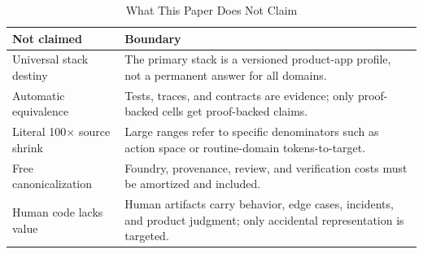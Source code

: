 \begin{table}[t]
\caption{What This Paper Does Not Claim}
\label{tab:notclaimed}
\centering
\footnotesize
\begin{tabularx}{\columnwidth}{p{}X}
\toprule
Not claimed & Boundary \\
\midrule
Universal stack destiny & The primary stack is a versioned product-app profile, not a permanent answer for all domains. \\
Automatic equivalence & Tests, traces, and contracts are evidence; only proof-backed cells get proof-backed claims. \\
Literal 100$\times$ source shrink & Large ranges refer to specific denominators such as action space or routine-domain tokens-to-target. \\
Free canonicalization & Foundry, provenance, review, and verification costs must be amortized and included. \\
Human code lacks value & Human artifacts carry behavior, edge cases, incidents, and product judgment; only accidental representation is targeted. \\
\bottomrule
\end{tabularx}
\end{table}

